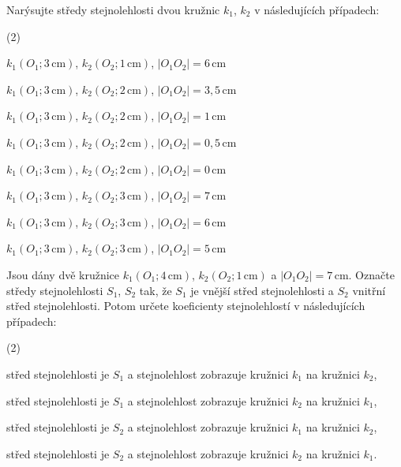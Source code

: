 \documentclass[12pt,a4paper]{article}
\begin{document}

\setcounter{section}{3}

\begin{exercise}

    Narýsujte středy stejnolehlosti dvou kružnic $k_1$, $k_2$ v následujících případech:

    \begin{tasks}(2)

        \task $k_1(O_1;3\,\mathrm{cm})$, $k_2(O_2;1\,\mathrm{cm})$, $|O_1O_2|=6\,\mathrm{cm}$

        \task $k_1(O_1;3\,\mathrm{cm})$, $k_2(O_2;2\,\mathrm{cm})$, $|O_1O_2|=3{,}5\,\mathrm{cm}$

        \task $k_1(O_1;3\,\mathrm{cm})$, $k_2(O_2;2\,\mathrm{cm})$, $|O_1O_2|=1\,\mathrm{cm}$

        \task $k_1(O_1;3\,\mathrm{cm})$, $k_2(O_2;2\,\mathrm{cm})$, $|O_1O_2|=0{,}5\,\mathrm{cm}$

        \task $k_1(O_1;3\,\mathrm{cm})$, $k_2(O_2;2\,\mathrm{cm})$, $|O_1O_2|=0\,\mathrm{cm}$

        \task $k_1(O_1;3\,\mathrm{cm})$, $k_2(O_2;3\,\mathrm{cm})$, $|O_1O_2|=7\,\mathrm{cm}$

        \task $k_1(O_1;3\,\mathrm{cm})$, $k_2(O_2;3\,\mathrm{cm})$, $|O_1O_2|=6\,\mathrm{cm}$

        \task $k_1(O_1;3\,\mathrm{cm})$, $k_2(O_2;3\,\mathrm{cm})$, $|O_1O_2|=5\,\mathrm{cm}$

    \end{tasks}

\end{exercise}



\begin{exercise}

    Jsou dány dvě kružnice $k_1(O_1;4\,\mathrm{cm})$, $k_2(O_2;1\,\mathrm{cm})$ a $|O_1O_2|=7\,\mathrm{cm}$.
    Označte středy stejnolehlosti $S_1$, $S_2$ tak, že $S_1$ je vnější střed stejnolehlosti a $S_2$ vnitřní střed stejnolehlosti.
    Potom určete koeficienty stejnolehlostí v následujících případech:

    \begin{tasks}(2)

        \task střed stejnolehlosti je $S_1$ a stejnolehlost zobrazuje kružnici $k_1$ na kružnici $k_2$,

        \task střed stejnolehlosti je $S_1$ a stejnolehlost zobrazuje kružnici $k_2$ na kružnici $k_1$,

        \task střed stejnolehlosti je $S_2$ a stejnolehlost zobrazuje kružnici $k_1$ na kružnici $k_2$,

        \task střed stejnolehlosti je $S_2$ a stejnolehlost zobrazuje kružnici $k_2$ na kružnici $k_1$.

    \end{tasks}

\end{exercise}
\end{document}
